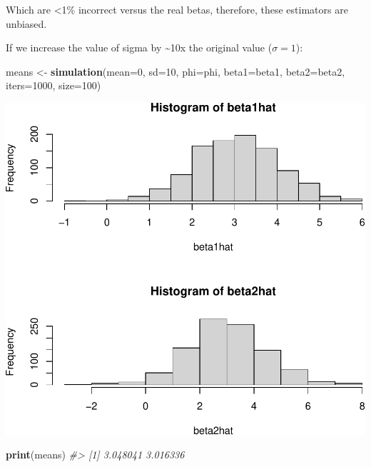 \documentclass[]{article}
\newenvironment{Shaded}{\begin{snugshade}}{\end{snugshade}}
\newcommand{\CommentTok}[1]{\textcolor[rgb]{0.56,0.35,0.01}{\textit{#1}}}
\newcommand{\DataTypeTok}[1]{\textcolor[rgb]{0.13,0.29,0.53}{#1}}
\newcommand{\DecValTok}[1]{\textcolor[rgb]{0.00,0.00,0.81}{#1}}
\newcommand{\KeywordTok}[1]{\textcolor[rgb]{0.13,0.29,0.53}{\textbf{#1}}}
\newcommand{\NormalTok}[1]{#1}
\newcommand{\StringTok}[1]{\textcolor[rgb]{0.31,0.60,0.02}{#1}}
\begin{document}
Which are \textless{}1\% incorrect versus the real betas, therefore,
these estimators are unbiased.

\newpage

If we increase the value of sigma by \textasciitilde{}10x the original
value (\(\sigma = 1\)):

\begin{Shaded}
\begin{Highlighting}[]
\NormalTok{means <-}\StringTok{ }\KeywordTok{simulation}\NormalTok{(}\DataTypeTok{mean=}\DecValTok{0}\NormalTok{, }\DataTypeTok{sd=}\DecValTok{10}\NormalTok{, }\DataTypeTok{phi=}\NormalTok{phi, }\DataTypeTok{beta1=}\NormalTok{beta1, }\DataTypeTok{beta2=}\NormalTok{beta2, }\DataTypeTok{iters=}\DecValTok{1000}\NormalTok{, }\DataTypeTok{size=}\DecValTok{100}\NormalTok{)}
\end{Highlighting}
\end{Shaded}

\includegraphics{./figures/unnamed-chunk-7-1.pdf}

\begin{Shaded}
\begin{Highlighting}[]
\KeywordTok{print}\NormalTok{(means)}
\CommentTok{#> [1] 3.048041 3.016336}
\end{Highlighting}
\end{Shaded}
\end{document}
